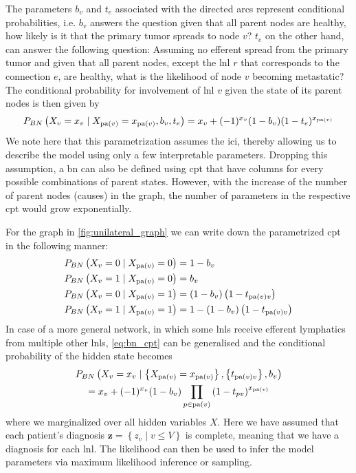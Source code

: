 \documentclass[../ms.tex]{subfiles}
\begin{document}
The parameters $b_v$ and $t_e$ associated with the directed arcs represent conditional probabilities, i.e. $b_v$ answers the question given that all parent nodes are healthy, how likely is it that the primary tumor spreads to node $v$? $t_e$ on the other hand, can answer the following question: Assuming no efferent spread from the primary tumor and given that all parent nodes, except the \gls{lnl} $r$ that corresponds to the connection $e$, are healthy, what is the likelihood of node $v$ becoming metastatic? The conditional probability for involvement of \gls{lnl} $v$ given the state of its parent nodes is then given by
%
\begin{equation}
    P_{BN} \left( X_v = x_v \mid X_{\operatorname{pa}(v)} = x_{\operatorname{pa}(v)}, b_v, t_e \right) = x_v + (-1)^{x_v} (1 - b_v) (1 - t_e)^{x_{\operatorname{pa}(v)}}
\end{equation}
%
We note here that this parametrization assumes the \gls{ici}, thereby allowing us to describe the model using only a few interpretable parameters. Dropping this assumption, a \gls{bn} can also be defined using \gls{cpt} that have columns for every possible combinations of parent states. However, with the increase of the number of parent nodes (causes) in the graph, the number of parameters in the respective \gls{cpt} would grow exponentially.

For the graph in \cref{fig:unilateral_graph} we can write down the parametrized \gls{cpt} in the following manner:
%
\begin{equation} \label{eq:bn_cpt}
    \begin{aligned}
        P_{BN} \left( X_v = 0 \mid X_{\operatorname{pa}(v)} = 0 \right) &= 1 - b_v \\
        P_{BN} \left( X_v = 1 \mid X_{\operatorname{pa}(v)} = 0 \right) &= b_v \\
        P_{BN} \left( X_v = 0 \mid X_{\operatorname{pa}(v)} = 1 \right) &= (1 - b_v) \left(1 - t_{\operatorname{pa}(v)v}\right) \\
        P_{BN} \left( X_v = 1 \mid X_{\operatorname{pa}(v)} = 1 \right) &= 1 - (1 - b_v) \left(1 - t_{\operatorname{pa}(v)v}\right) 
    \end{aligned}
\end{equation}
%
In case of a more general network, in which some \glspl{lnl} receive efferent lymphatics from multiple other \glspl{lnl}, \cref{eq:bn_cpt} can be generalised and the conditional probability of the hidden state becomes
%
\begin{multline}
    P_{BN} \left( X_v = x_v \mid \left\{ X_{\operatorname{pa}(v)} = x_{\operatorname{pa}(v)} \right\}, \left\{ t_{\operatorname{pa}(v)v} \right\} , b_v \right) \\
    = x_v + (-1)^{x_v} (1 - b_v) \prod_{p \in \operatorname{pa}(v)}{\left( 1 - t_{pv} \right)}^{x_{\operatorname{pa}(v)}}
\end{multline}
%
where we marginalized over all hidden variables $X$. Here we have assumed that each patient's diagnosis $\mathbf{z} = \left\{ z_v \mid v \leq V \right\}$ is complete, meaning that we have a diagnosis for each \gls{lnl}. The likelihood can then be used to infer the model parameters via maximum likelihood inference or sampling.
\end{document}
